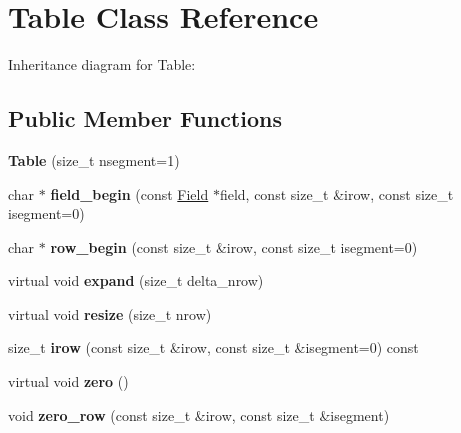 \hypertarget{classTable}{}\section{Table Class Reference}
\label{classTable}


Inheritance diagram for Table\+:
\subsection*{Public Member Functions}
\begin{DoxyCompactItemize}
\item 
{\bfseries Table} (size\+\_\+t nsegment=1)\hypertarget{classTable_ae1dbb32b5ecc4a00bdad1cb374abf8c7}{}\label{classTable_ae1dbb32b5ecc4a00bdad1cb374abf8c7}

\item 
char $\ast$ {\bfseries field\+\_\+begin} (const \hyperlink{classField}{Field} $\ast$field, const size\+\_\+t \&irow, const size\+\_\+t isegment=0)\hypertarget{classTable_a73fd205958befbe99b7bad0a8fcd5dcf}{}\label{classTable_a73fd205958befbe99b7bad0a8fcd5dcf}

\item 
char $\ast$ {\bfseries row\+\_\+begin} (const size\+\_\+t \&irow, const size\+\_\+t isegment=0)\hypertarget{classTable_a4d9e8c3c175e18396cc36794a724a332}{}\label{classTable_a4d9e8c3c175e18396cc36794a724a332}

\item 
virtual void {\bfseries expand} (size\+\_\+t delta\+\_\+nrow)\hypertarget{classTable_a8377eb2e687a2e59c00ce2a5ac57a019}{}\label{classTable_a8377eb2e687a2e59c00ce2a5ac57a019}

\item 
virtual void {\bfseries resize} (size\+\_\+t nrow)\hypertarget{classTable_a1b74b77f28744aa15c9a704a9577e80d}{}\label{classTable_a1b74b77f28744aa15c9a704a9577e80d}

\item 
size\+\_\+t {\bfseries irow} (const size\+\_\+t \&irow, const size\+\_\+t \&isegment=0) const \hypertarget{classTable_a4be760d5b55da5346bc596fc20665470}{}\label{classTable_a4be760d5b55da5346bc596fc20665470}

\item 
virtual void {\bfseries zero} ()\hypertarget{classTable_aa68576cdd35bf3994d2fbb4c21d30a49}{}\label{classTable_aa68576cdd35bf3994d2fbb4c21d30a49}

\item 
void {\bfseries zero\+\_\+row} (const size\+\_\+t \&irow, const size\+\_\+t \&isegment)\hypertarget{classTable_a5e76e637cd8ed9d8bcc1797ef416f2e6}{}\label{classTable_a5e76e637cd8ed9d8bcc1797ef416f2e6}


\end{DoxyCompactItemize}
